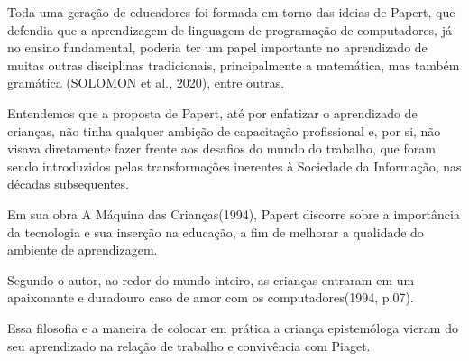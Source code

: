 \documentclass[
12pt,		%
openright,	%
twoside,  %
a4paper,			%
chapter=TITLE,		%
english,			%
french,				%
spanish,			%
brazil				%
]{USPSC-classe/USPSC}
\begin{document}
Toda uma gera\c{c}\~ao de educadores foi formada em torno das ideias de Papert, que defendia que a aprendizagem de linguagem de programa\c{c}\~ao de computadores, j\'a no ensino fundamental, poderia ter um papel importante no aprendizado de muitas outras disciplinas tradicionais, principalmente a matem\'atica, mas tamb\'em gram\'atica (SOLOMON et al., 2020), entre outras.








Entendemos que a proposta de Papert, at\'e por enfatizar o aprendizado de crian\c{c}as, n\~ao tinha qualquer ambi\c{c}\~ao de capacita\c{c}\~ao profissional e, por si, n\~ao visava diretamente fazer frente aos desafios do \textquotedbl mundo do trabalho\textquotedbl , que foram sendo introduzidos pelas transforma\c{c}\~oes inerentes \`a Sociedade da Informa\c{c}\~ao, nas d\'ecadas subsequentes.








Em sua obra \textquotedbl A M\'aquina das Crian\c{c}as\textquotedbl  (1994), Papert discorre sobre a import\^ancia da tecnologia e sua inser\c{c}\~ao na educa\c{c}\~ao, a fim de melhorar a qualidade do ambiente de aprendizagem.









\noindent\begin{center}\mbox{\centering{}}\end{center}


Segundo o autor, \textquotedbl ao redor do mundo inteiro, as crian\c{c}as entraram em um apaixonante e duradouro caso de amor com os computadores\textquotedbl  (1994, p.07).








Essa filosofia e a maneira de colocar em pr\'atica a crian\c{c}a epistem\'ologa vieram do seu aprendizado na rela\c{c}\~ao de trabalho e conviv\^encia com Piaget.
\end{document}
